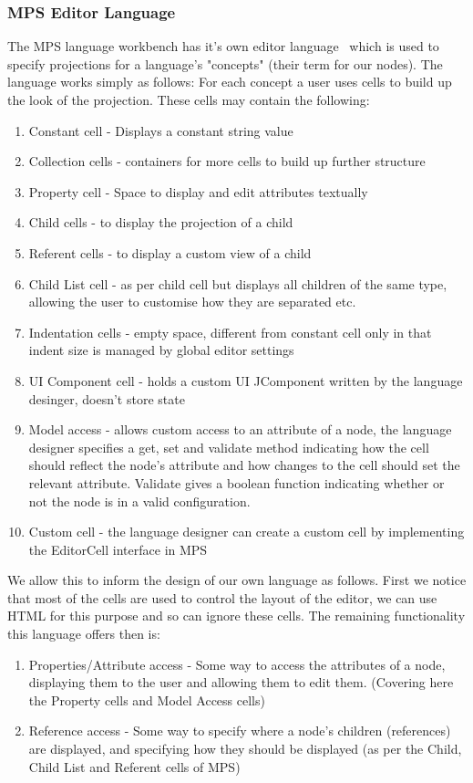 \documentclass{article}
\begin{document}
\subsubsection{MPS Editor Language}
The MPS language workbench has it's own editor language~\cite{mpsEditorLanguage} which is used to specify projections for a language's "concepts" (their term for our nodes). The language works simply as follows: For each concept a user uses cells to build up the look of the projection. These cells may contain the following:
\begin{enumerate}
\item Constant cell - Displays a constant string value
\item Collection cells - containers for more cells to build up further structure
\item Property cell - Space to display and edit attributes textually
\item Child cells - to display the projection of a child
\item Referent cells - to display a custom view of a child
\item Child List cell - as per child cell but displays all children of the same type, allowing the user to customise how they are separated etc.
\item Indentation cells - empty space, different from constant cell only in that indent size is managed by global editor settings
\item UI Component cell - holds a custom UI JComponent written by the language desinger, doesn't store state
\item Model access - allows custom access to an attribute of a node, the language designer specifies a get, set and validate method indicating how the cell should reflect the node's attribute and how changes to the cell should set the relevant attribute. Validate gives a boolean function indicating whether or not the node is in a valid configuration.
\item Custom cell - the language designer can create a custom cell by implementing the EditorCell interface in MPS
\end{enumerate}
%
We allow this to inform the design of our own language as follows. First we notice that most of the cells are used to control the layout of the editor, we can use HTML for this purpose and so can ignore these cells. The remaining functionality this language offers then is:
\begin{enumerate}
\item Properties/Attribute access - Some way to access the attributes of a node, displaying them to the user and allowing them to edit them.  (Covering here the Property cells and Model Access cells)
\item Reference access - Some way to specify where a node's children (references) are displayed, and specifying how they should be displayed (as per the Child, Child List and Referent cells of MPS)
\end{enumerate}
\end{document}
